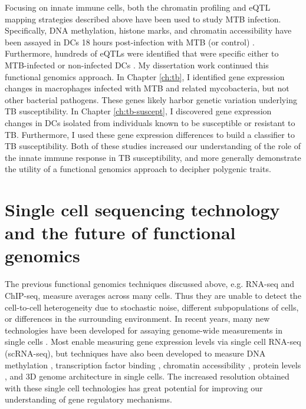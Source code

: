 Focusing on innate immune cells, both the chromatin profiling and eQTL
mapping strategies described above have been used to study MTB
infection. Specifically, DNA methylation, histone marks, and chromatin
accessibility have been assayed in DCs 18 hours post-infection with
MTB (or control) \citep{Pacis2015}. Furthermore, hundreds of eQTLs
were identified that were specific either to MTB-infected or
non-infected DCs \citep{Barreiro2012}. My dissertation work continued
this functional genomics approach. In Chapter \ref{ch:tb}, I
identified gene expression changes in macrophages infected with MTB
and related mycobacteria, but not other bacterial pathogens. These
genes likely harbor genetic variation underlying TB susceptibility. In
Chapter \ref{ch:tb-suscept}, I discovered gene expression changes in
DCs isolated from individuals known to be susceptible or resistant to
TB. Furthermore, I used these gene expression differences to build a
classifier to TB susceptibility. Both of these studies increased our
understanding of the role of the innate immune response in TB
susceptibility, and more generally demonstrate the utility of a
functional genomics approach to decipher polygenic traits.


\section{Single cell sequencing technology and the future of functional genomics}

The previous functional genomics techniques discussed above,
e.g. RNA-seq and ChIP-seq, measure averages across many cells. Thus
they are unable to detect the cell-to-cell heterogeneity due to
stochastic noise, different subpopulations of cells, or differences in
the surrounding environment. In recent years, many new technologies
have been developed for assaying genome-wide measurements in single
cells \citep{Liang2014, Macaulay2014, Saliba2014, Grun2015, Stegle2015, Bacher2016}.
Most enable measuring gene expression levels via single cell
RNA-seq (scRNA-seq), but techniques have also been developed to
measure DNA methylation \citep{Smallwood2014, Angermueller2016},
transcription factor binding \citep{Rotem2015},
chromatin accessibility \citep{Buenrostro2015, Cusanovich2015},
protein levels \citep{Genshaft2016}, and 3D genome architecture \citep{Nagano2013}
in single cells. The increased resolution
obtained with these single cell technologies has great potential for
improving our understanding of gene regulatory mechanisms.

